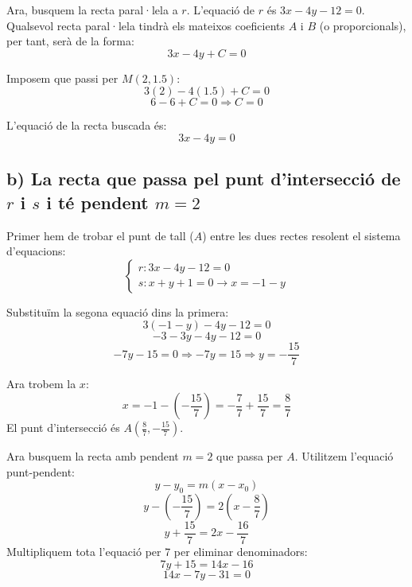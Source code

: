 \documentclass[12pt,a4paper]{article}
\begin{document}
Ara, busquem la recta paral·lela a $r$.
L'equació de $r$ és $3x - 4y - 12 = 0$. Qualsevol recta paral·lela tindrà els mateixos coeficients $A$ i $B$ (o proporcionals), per tant, serà de la forma:
\[ 3x - 4y + C = 0 \]

Imposem que passi per $M(2, 1.5)$:
\[ 3(2) - 4(1.5) + C = 0 \]
\[ 6 - 6 + C = 0 \Rightarrow C = 0 \]

L'equació de la recta buscada és:
\[ \boxed{3x - 4y = 0} \]

\begin{center}
\end{center}

\subsection*{b) La recta que passa pel punt d'intersecció de $r$ i $s$ i té pendent $m=2$}

Primer hem de trobar el punt de tall ($A$) entre les dues rectes resolent el sistema d'equacions:
\[
\begin{cases}
r: 3x - 4y - 12 = 0 \\
s: x + y + 1 = 0 \rightarrow x = -1 - y
\end{cases}
\]

Substituïm la segona equació dins la primera:
\[ 3(-1 - y) - 4y - 12 = 0 \]
\[ -3 - 3y - 4y - 12 = 0 \]
\[ -7y - 15 = 0 \Rightarrow -7y = 15 \Rightarrow y = -\frac{15}{7} \]

Ara trobem la $x$:
\[ x = -1 - \left(-\frac{15}{7}\right) = -\frac{7}{7} + \frac{15}{7} = \frac{8}{7} \]
El punt d'intersecció és $A\left(\frac{8}{7}, -\frac{15}{7}\right)$.

Ara busquem la recta amb pendent $m=2$ que passa per $A$. Utilitzem l'equació punt-pendent:
\[ y - y_0 = m(x - x_0) \]
\[ y - \left(-\frac{15}{7}\right) = 2\left(x - \frac{8}{7}\right) \]
\[ y + \frac{15}{7} = 2x - \frac{16}{7} \]
Multipliquem tota l'equació per 7 per eliminar denominadors:
\[ 7y + 15 = 14x - 16 \]
\[ 14x - 7y - 31 = 0 \]
\end{document}
